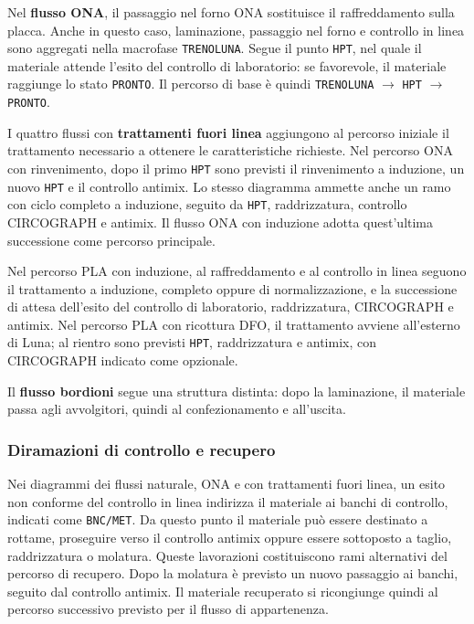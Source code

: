 Nel \textbf{flusso ONA}, il passaggio nel forno ONA sostituisce il raffreddamento sulla placca. Anche in questo caso, laminazione, passaggio nel forno e controllo in linea sono aggregati nella macrofase \texttt{TRENOLUNA}. Segue il punto \texttt{HPT}, nel quale il materiale attende l'esito del controllo di laboratorio: se favorevole, il materiale raggiunge lo stato \texttt{PRONTO}. Il percorso di base è quindi \texttt{TRENOLUNA} $\rightarrow$ \texttt{HPT} $\rightarrow$ \texttt{PRONTO}.

I quattro flussi con \textbf{trattamenti fuori linea} aggiungono al percorso iniziale il trattamento necessario a ottenere le caratteristiche richieste. Nel percorso ONA con rinvenimento, dopo il primo \texttt{HPT} sono previsti il rinvenimento a induzione, un nuovo \texttt{HPT} e il controllo antimix. Lo stesso diagramma ammette anche un ramo con ciclo completo a induzione, seguito da \texttt{HPT}, raddrizzatura, controllo CIRCOGRAPH e antimix. Il flusso ONA con induzione adotta quest'ultima successione come percorso principale.

Nel percorso PLA con induzione, al raffreddamento e al controllo in linea seguono il trattamento a induzione, completo oppure di normalizzazione, e la successione di attesa dell'esito del controllo di laboratorio, raddrizzatura, CIRCOGRAPH e antimix. Nel percorso PLA con ricottura DFO, il trattamento avviene all'esterno di Luna; al rientro sono previsti \texttt{HPT}, raddrizzatura e antimix, con CIRCOGRAPH indicato come opzionale.

Il \textbf{flusso bordioni} segue una struttura distinta: dopo la laminazione, il materiale passa agli avvolgitori, quindi al confezionamento e all'uscita.

\subsubsection{Diramazioni di controllo e recupero}

Nei diagrammi dei flussi naturale, ONA e con trattamenti fuori linea, un esito non conforme del controllo in linea indirizza il materiale ai banchi di controllo, indicati come \texttt{BNC/MET}. Da questo punto il materiale può essere destinato a rottame, proseguire verso il controllo antimix oppure essere sottoposto a taglio, raddrizzatura o molatura. Queste lavorazioni costituiscono rami alternativi del percorso di recupero. Dopo la molatura è previsto un nuovo passaggio ai banchi, seguito dal controllo antimix. Il materiale recuperato si ricongiunge quindi al percorso successivo previsto per il flusso di appartenenza.

